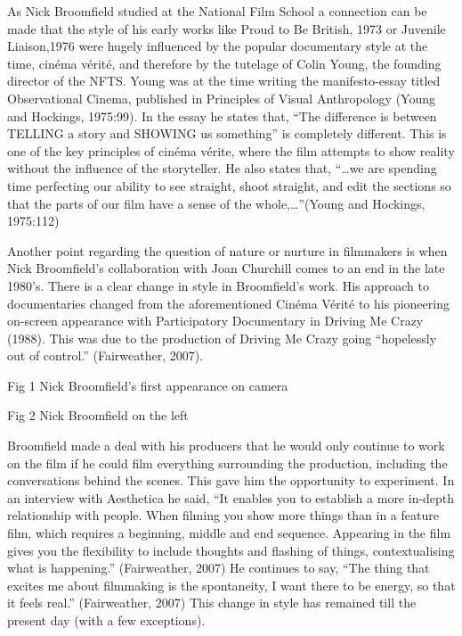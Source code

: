 \documentclass[
  12pt,
]{book}
\begin{document}
As Nick Broomfield studied at the National Film School a connection can be made that the style of his early works like Proud to Be British, 1973 or Juvenile Liaison,1976 were hugely influenced by the popular documentary style at the time, cinéma vérité, and therefore by the tutelage of Colin Young, the founding director of the NFTS. Young was at the time writing the manifesto-essay titled Observational Cinema, published in Principles of Visual Anthropology (Young and Hockings, 1975:99). In the essay he states that, ``The difference is between TELLING a story and SHOWING us something'' is completely different. This is one of the key principles of cinéma vérite, where the film attempts to show reality without the influence of the storyteller. He also states that, ``\ldots we are spending time perfecting our ability to see straight, shoot straight, and edit the sections so that the parts of our film have a sense of the whole,\ldots{}''(Young and Hockings, 1975:112)

Another point regarding the question of nature or nurture in filmmakers is when Nick Broomfield's collaboration with Joan Churchill comes to an end in the late 1980's. There is a clear change in style in Broomfield's work. His approach to documentaries changed from the aforementioned Cinéma Vérité to his pioneering on-screen appearance with Participatory Documentary in Driving Me Crazy (1988). This was due to the production of Driving Me Crazy going ``hopelessly out of control.'' (Fairweather, 2007).

Fig 1 Nick Broomfield's first appearance on camera

Fig 2 Nick Broomfield on the left

Broomfield made a deal with his producers that he would only continue to work on the film if he could film everything surrounding the production, including the conversations behind the scenes. This gave him the opportunity to experiment. In an interview with Aesthetica he said, ``It enables you to establish a more in-depth relationship with people. When filming you show more things than in a feature film, which requires a beginning, middle and end sequence. Appearing in the film gives you the flexibility to include thoughts and flashing of things, contextualising what is happening.'' (Fairweather, 2007) He continues to say, ``The thing that excites me about filmmaking is the spontaneity, I want there to be energy, so that it feels real.'' (Fairweather, 2007) This change in style has remained till the present day (with a few exceptions).
\end{document}
